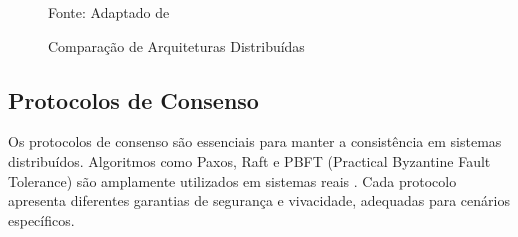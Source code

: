 \begin{figure}[H]
  \centering
  \caption{Comparação de Arquiteturas Distribuídas}
  \label{fig:comparacao_arquiteturas}

  \raggedright{\fontsize{10pt}{\baselineskip}\selectfont Fonte: Adaptado de }
\end{figure}

\subsection{Protocolos de Consenso}

Os protocolos de consenso são essenciais para manter a consistência em sistemas distribuídos. Algoritmos como Paxos, Raft e PBFT (Practical Byzantine Fault Tolerance) são amplamente utilizados em sistemas reais \cite{lamport1978time}. Cada protocolo apresenta diferentes garantias de segurança e vivacidade, adequadas para cenários específicos.



